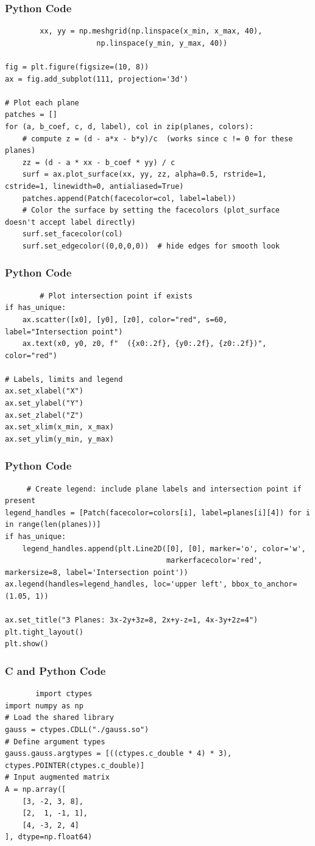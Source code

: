 \documentclass{beamer}
\begin{document}
\begin{frame}[fragile]
    \frametitle{Python Code}
    \begin{lstlisting}
        xx, yy = np.meshgrid(np.linspace(x_min, x_max, 40),
                     np.linspace(y_min, y_max, 40))

fig = plt.figure(figsize=(10, 8))
ax = fig.add_subplot(111, projection='3d')

# Plot each plane
patches = []
for (a, b_coef, c, d, label), col in zip(planes, colors):
    # compute z = (d - a*x - b*y)/c  (works since c != 0 for these planes)
    zz = (d - a * xx - b_coef * yy) / c
    surf = ax.plot_surface(xx, yy, zz, alpha=0.5, rstride=1, cstride=1, linewidth=0, antialiased=True)
    patches.append(Patch(facecolor=col, label=label))
    # Color the surface by setting the facecolors (plot_surface doesn't accept label directly)
    surf.set_facecolor(col)
    surf.set_edgecolor((0,0,0,0))  # hide edges for smooth look
    \end{lstlisting}
\end{frame}
\begin{frame}[fragile]
    \frametitle{Python Code}
    \begin{lstlisting}
        # Plot intersection point if exists
if has_unique:
    ax.scatter([x0], [y0], [z0], color="red", s=60, label="Intersection point")
    ax.text(x0, y0, z0, f"  ({x0:.2f}, {y0:.2f}, {z0:.2f})", color="red")

# Labels, limits and legend
ax.set_xlabel("X")
ax.set_ylabel("Y")
ax.set_zlabel("Z")
ax.set_xlim(x_min, x_max)
ax.set_ylim(y_min, y_max)
    \end{lstlisting}
\end{frame}
\begin{frame}[fragile]
    \frametitle{Python Code}
    \begin{lstlisting}
     # Create legend: include plane labels and intersection point if present
legend_handles = [Patch(facecolor=colors[i], label=planes[i][4]) for i in range(len(planes))]
if has_unique:
    legend_handles.append(plt.Line2D([0], [0], marker='o', color='w',
                                     markerfacecolor='red', markersize=8, label='Intersection point'))
ax.legend(handles=legend_handles, loc='upper left', bbox_to_anchor=(1.05, 1))

ax.set_title("3 Planes: 3x-2y+3z=8, 2x+y-z=1, 4x-3y+2z=4")
plt.tight_layout()
plt.show()   
    \end{lstlisting}
\end{frame}
\begin{frame}[fragile]
    \frametitle{C and Python Code}
    \begin{lstlisting}
       import ctypes
import numpy as np
# Load the shared library
gauss = ctypes.CDLL("./gauss.so")
# Define argument types
gauss.gauss.argtypes = [((ctypes.c_double * 4) * 3), ctypes.POINTER(ctypes.c_double)]
# Input augmented matrix
A = np.array([
    [3, -2, 3, 8],
    [2,  1, -1, 1],
    [4, -3, 2, 4]
], dtype=np.float64)
 
    \end{lstlisting}
\end{frame}
\end{document}
